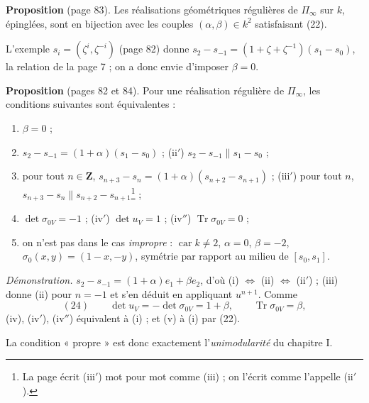 \documentclass[11pt,a4paper]{article}
\begin{document}
\textbf{Proposition} (page 83). Les réalisations géométriques régulières de
$\Pi_\infty$ sur $k$, épinglées, sont en bijection avec les couples $(\alpha,
\beta) \in k^2$ satisfaisant (22).

L'exemple $s_i = (\zeta^i, \zeta^{-i})$ (page 82) donne $s_2 - s_{-1} = (1 +
\zeta + \zeta^{-1})(s_1 - s_0)$, la relation de la page 7 ; on a donc envie
d'imposer $\beta = 0$.

\textbf{Proposition} (pages 82 et 84). Pour une réalisation régulière de
$\Pi_\infty$, les conditions suivantes sont équivalentes :
\begin{enumerate}
  \item[(i)] $\beta = 0$ ;
  \item[(ii)] $s_2 - s_{-1} = (1 + \alpha)(s_1 - s_0)$ ; (ii$'$) $s_2 -
    s_{-1} \parallel s_1 - s_0$ ;
  \item[(iii)] pour tout $n \in \mathbf{Z}$, $s_{n+3} - s_n = (1 + \alpha)(s_{n+2}
    - s_{n+1})$ ; (iii$'$) pour tout $n$, $s_{n+3} - s_n \parallel s_{n+2} -
    s_{n+1}$\footnote{La page écrit (iii$'$) mot pour mot comme (iii) ; on
    l'écrit comme l'appelle (ii$'$).} ;
  \item[(iv)] $\det \sigma_{0V} = -1$ ; (iv$'$) $\det u_V = 1$ ; (iv$''$)
    $\operatorname{Tr} \sigma_{0V} = 0$ ;
  \item[(v)] on n'est pas dans le cas \emph{impropre} : $\operatorname{car} k
    \neq 2$, $\alpha = 0$, $\beta = -2$, $\sigma_0(x, y) = (1 - x, -y)$,
    symétrie par rapport au milieu de $[s_0, s_1]$.
\end{enumerate}
\emph{Démonstration.} $s_2 - s_{-1} = (1 + \alpha) e_1 + \beta e_2$, d'où (i)
$\Leftrightarrow$ (ii) $\Leftrightarrow$ (ii$'$) ; (iii) donne (ii) pour $n =
-1$ et s'en déduit en appliquant $u^{n+1}$. Comme
\[
  (24) \qquad \det u_V = -\det \sigma_{0V} = 1 + \beta, \qquad
  \operatorname{Tr} \sigma_{0V} = \beta ,
\]
(iv), (iv$'$), (iv$''$) équivalent à (i) ; et (v) à (i) par (22).

La condition « propre » est donc exactement l'\emph{unimodularité} du
chapitre I.
\end{document}

